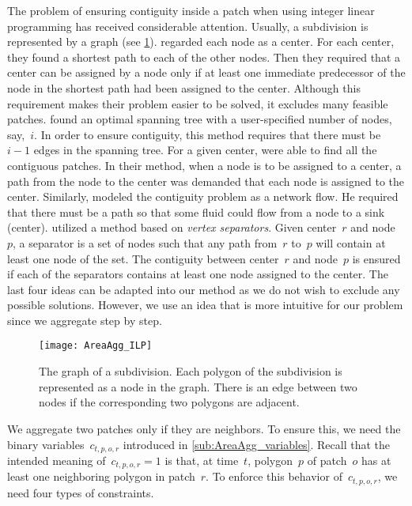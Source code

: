 The problem of ensuring contiguity inside a patch 
when using integer linear programming 
has received considerable attention.
Usually, a subdivision is represented by a graph
(see \fig\ref{fig:AreaAgg_Variables_Graph}).
%
\textcite{Zoltners1983Territory} regarded each node as a center.
For each center, they found a shortest path 
to each of the other nodes.
Then they required that a center can be assigned 
by a node only if 
at least one immediate predecessor of the node 
in the shortest path had been assigned to the center.
Although this requirement makes their problem easier to be 
solved,
it excludes many feasible patches.
%
\textcite{Williams2002Contiguous} found an optimal spanning tree 
with a user-specified number of nodes, say,~$i$.
In order to ensure contiguity, this method requires that 
there must be~$i-1$ edges in the spanning tree.
%
For a given center, \textcite{Cova2000_Contiguity} 
were able to find all the contiguous patches.
In their method, when a node is to be assigned to a center, 
a path from the node to the center was demanded 
that each node is assigned to the center.
%
Similarly, \textcite{Shirabe2005Contiguity} modeled 
the contiguity problem as a network flow.
He required that there must be a path so that 
some fluid could flow from a node to a sink (center).
%
\textcite{Oehrlein2017Aggregation} utilized a method based 
on \emph{vertex separators}.	
Given center~$r$ and node~$p$, 
a separator is a set of nodes
such that any path from~$r$ to~$p$ 
will contain at least one node of the set.
The contiguity between center~$r$ and node~$p$ is ensured 
if each of the separators contains 
at least one node assigned to the center.
%
The last four ideas can be adapted into our method
as we do not wish to exclude any possible solutions.
However, we use an idea
that is more intuitive for our problem
since we aggregate step by step.


\begin{figure}[tb]
\centering
\texttt{[image: AreaAgg\_ILP]}
\caption{The graph of a subdivision.
	Each polygon of the subdivision is represented as a node 
	in the graph.
	There is an edge between two nodes
	if the corresponding two polygons are adjacent.
}
\label{fig:AreaAgg_Variables_Graph}
\end{figure} 

We aggregate two patches only if they are neighbors.
To ensure this, we need the binary variables~$c_{t,p,o,r}$
introduced in \sect\ref{sub:AreaAgg_variables}.
Recall that the intended meaning of~$c_{t,p,o,r}=1$ 
is that, at time~$t$, 
polygon~$p$ of patch~$o$ has 
at least one neighboring polygon in patch~$r$.
To enforce this behavior of~$c_{t,p,o,r}$, 
we need four types of constraints.

